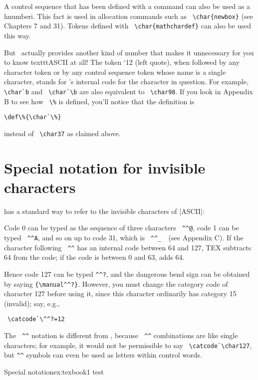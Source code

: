 A control sequence that has been defined with a \cmd{\chardef} command can also be used as a hnumberi.
This fact is used in allocation commands such as \verb+ \char{newbox}+ (see Chapters 7 and 31). Tokens defined
with \verb+ \char{mathchardef}+ can also be used this way.


But \tex\ actually provides another kind of number that makes it unnecessary
for you to know texttt{ASCII} at all! The token `12 (left quote), when followed by
any character token or by any control sequence token whose name is a single character,
stands for \tex's internal code for the character in question. For example, \verb+\char`b+ and
\verb+ \char`\b+ are also equivalent to \verb+ \char98+. If you look in Appendix B to see how \verb+ \%+ is
defined, you'll notice that the definition is

\verb+\def\%{\char`\%}+

instead of \verb+ \char37+  as claimed above.

\section{Special notation for invisible characters}

\tex has a standard way to refer to the invisible characters of |ASCII|: 

Code 0 can be typed as the sequence of three characters \verb+ ^^@+, code 1 can be typed
\verb+ ^^A+, and so on up to code 31, which is \verb+ ^^_  +(see Appendix C). If the character following
\verb+ ^^+ has an internal code between 64 and 127, TEX subtracts 64 from the code; if the
code is between 0 and 63, \tex adds 64. 

Hence code 127 can be typed \verb+^^?+, and
the dangerous bend sign can be obtained by saying \verb+{\manual^^?}+. However, you must
change the category code of character 127 before using it, since this character ordinarily
has category 15 (invalid); say, e.g., 

\verb+ \catcode`\^^?=12 +

The \verb+ ^^+ notation is different from
\cmd{\char}, because \verb+ ^^+ combinations are like single characters; for example, it would not
be permissible to say \verb+ \catcode`\char127+, but \verb+^^+ symbols can even be used as letters within control words.

\begin{texexample}{Special notation}{ex:texbook1}
\def\^^zz{test}
\^^zz
\end{texexample}


